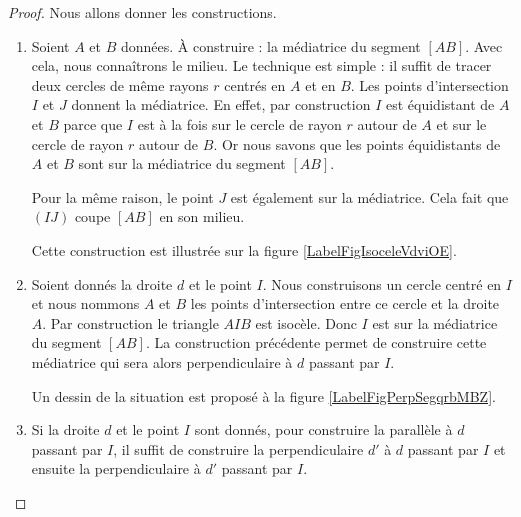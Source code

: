 \begin{proof}
    Nous allons donner les constructions.
    \begin{enumerate}
        \item
            Soient \( A\) et \( B\) données. À construire : la médiatrice du segment \( [AB]\). Avec cela, nous connaîtrons le milieu. Le technique est simple : il suffit de tracer deux cercles de même rayons \( r\) centrés en \( A\) et en \( B\). Les points d'intersection \( I\) et \( J\) donnent la médiatrice. En effet, par construction \( I\) est équidistant de \( A\) et \( B\) parce que \( I\) est à la fois sur le cercle de rayon \( r\) autour de \( A\) et sur le cercle de rayon \( r\) autour de \( B\). Or nous savons que les points équidistants de \( A\) et \( B\) sont sur la médiatrice du segment \( [AB]\).

            Pour la même raison, le point \( J\) est également sur la médiatrice. Cela fait que \( (IJ)\) coupe \( [AB]\) en son milieu.

Cette construction est illustrée sur la figure \ref{LabelFigIsoceleVdviOE}. %
\newcommand{\CaptionFigIsoceleVdviOE}{Le triangle \( AJB\) est isocèle.}


        \item

            Soient donnés la droite \( d\) et le point \( I\). Nous construisons un cercle centré en \( I\) et nous nommons \( A\) et $B$ les points d'intersection entre ce cercle et la droite \( A\). Par construction le triangle \( AIB\) est isocèle. Donc \( I\) est sur la médiatrice du segment \( [AB]\). La construction précédente permet de construire cette médiatrice qui sera alors perpendiculaire à \( d\) passant par \( I\).

Un dessin de la situation est proposé à la figure \ref{LabelFigPerpSegqrbMBZ}. %
\newcommand{\CaptionFigPerpSegqrbMBZ}{Le triangle \( AIB\) est isocèle et la droite rouge est la médiatrice de \( [AB]\).}


    \item
        
        Si la droite \( d\) et le point \( I\) sont donnés, pour construire la parallèle à \( d\) passant par \( I\), il suffit de construire la perpendiculaire \( d'\) à \( d\) passant par \( I\) et ensuite la perpendiculaire à \( d'\) passant par \( I\).

    \end{enumerate}
\end{proof}


